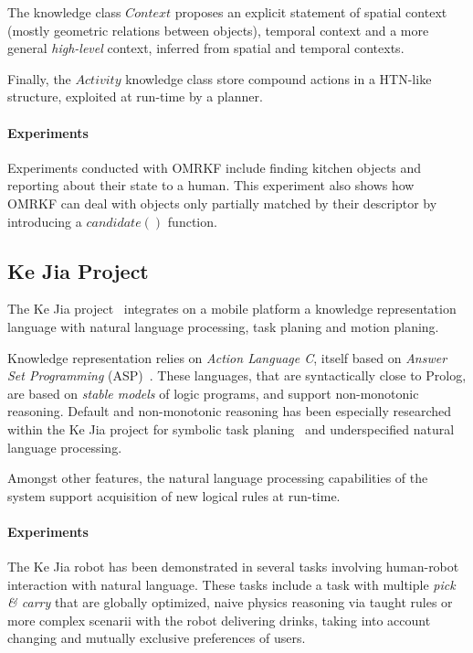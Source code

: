 \documentclass[a4paper, twocolumn]{article}
\begin{document}
The knowledge class $Context$ proposes an explicit statement of spatial context
(mostly geometric relations between objects), temporal context and a more
general \emph{high-level} context, inferred from spatial and temporal contexts.

Finally, the $Activity$ knowledge class store compound actions in a HTN-like
structure, exploited at run-time by a planner.

\paragraph{Experiments} Experiments conducted with OMRKF include finding
kitchen objects and reporting about their state to a human.  This experiment
also shows how OMRKF can deal with objects only partially matched by their
descriptor by introducing a $candidate()$ function.

\subsection{Ke Jia Project}
\label{sect|kejia}

The Ke Jia project~\cite{Chen2010} integrates on a mobile platform a knowledge
representation language with natural language processing, task planing and
motion planing.

Knowledge representation relies on \emph{Action Language C}, itself based on
\emph{Answer Set Programming} (ASP)~\cite{Gelfond2008}. These languages, that
are syntactically close to Prolog, are based on \emph{stable models} of logic
programs, and support non-monotonic reasoning. Default and non-monotonic
reasoning has been especially researched within the Ke Jia project for symbolic
task planing~\cite{Ji2011} and underspecified natural language processing.

Amongst other features, the natural language processing capabilities of the
system support acquisition of new logical rules at run-time.

\paragraph{Experiments} The Ke Jia robot has been demonstrated in several tasks
involving human-robot interaction with natural language. These tasks include a
task with multiple \emph{pick \& carry} that are globally optimized, naive
physics reasoning via taught rules or more complex scenarii with the robot
delivering drinks, taking into account changing and mutually exclusive
preferences of users.
\end{document}
